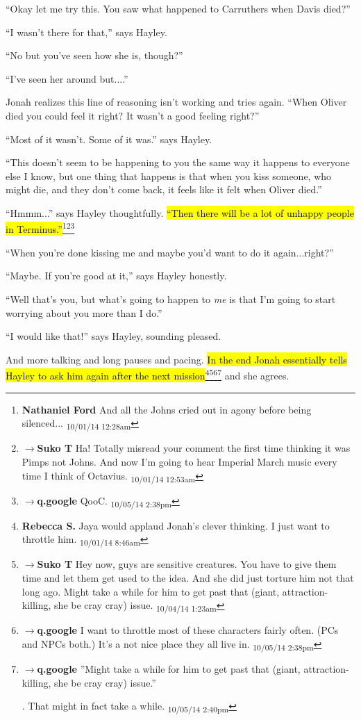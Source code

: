 ``Okay let me try this.  You saw what happened to Carruthers when Davis died?''

``I wasn't there for that,'' says Hayley.

``No but you've seen how she is, though?''

``I've seen her around but....''

Jonah realizes this line of reasoning isn't working and tries again.  ``When Oliver died you could feel it right?  It wasn't a good feeling right?''

``Most of it wasn't.  Some of it was.'' says Hayley.

``This doesn't seem to be happening to you the same way it happens to everyone else I know, but one thing that happens is that when you kiss someone, who might die, and they don't come back, it feels like it felt when Oliver died.''

``Hmmm...'' says Hayley thoughtfully.  \hl{``Then there will be a lot of unhappy people in Terminus.''}\footnote{\textbf{Nathaniel Ford }And all the Johns cried out in agony before being silenced... \textsubscript{10/01/14 12:28am}}\footnote{$\rightarrow$\textbf{Suko T }Ha!  Totally misread your comment the first time thinking it was Pimps not Johns.  And now I'm going to hear Imperial March music every time I think of Octavius. \textsubscript{10/01/14 12:53am}}\footnote{$\rightarrow$\textbf{q.google }QooC. \textsubscript{10/05/14 2:38pm}}

``When you're done kissing me and maybe you'd want to do it again...right?''

``Maybe.  If you're good at it,'' says Hayley honestly.

``Well that's you, but what's going to happen to \textit{me} is that I'm going to start worrying about you more than I do.''

``I would like that!'' says Hayley, sounding pleased.

And more talking and long pauses and pacing.   \hl{In the end Jonah essentially tells Hayley to ask him again after the next mission}\footnote{\textbf{Rebecca S. }Jaya would applaud Jonah's clever thinking.  I just want to throttle him. \textsubscript{10/01/14 8:46am}}\footnote{$\rightarrow$\textbf{Suko T }Hey now, guys are sensitive creatures. You have to give them time and let them get used to the idea.  And she did just torture him not that long ago.  Might take a while for him to get past that (giant, attraction-killing, she be cray cray) issue. \textsubscript{10/04/14 1:23am}}\footnote{$\rightarrow$\textbf{q.google }I want to throttle most of these characters fairly often.  (PCs and NPCs both.)  It's a not nice place they all live in. \textsubscript{10/05/14 2:38pm}}\footnote{$\rightarrow$\textbf{q.google }''Might take a while for him to get past that (giant, attraction-killing, she be cray cray) issue.''

.  That might in fact take a while. \textsubscript{10/05/14 2:40pm}} and she agrees.



